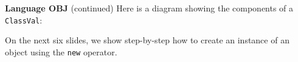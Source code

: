 \begin{minipage}[t]{\sw}
\slidenumber
\LARGE
{\bf Language OBJ} (continued)\exx
Here is a diagram showing the components of a \verb'ClassVal':\exx
\centerline{}
On the next six slides, we show step-by-step how
to create an instance of an object using the \verb'new' operator.
\end{minipage}
